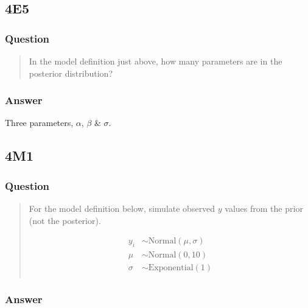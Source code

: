 \documentclass[
]{book}
\begin{document}
\hypertarget{e5-1}{%
\subsection*{4E5}\label{e5-1}}

\hypertarget{question-37}{%
\subsubsection*{Question}\label{question-37}}

\begin{quote}
In the model definition just above, how many parameters are in the posterior distribution?
\end{quote}

\hypertarget{answer-37}{%
\subsubsection*{Answer}\label{answer-37}}

Three parameters, \(\alpha\), \(\beta\) \& \(\sigma\).

\hypertarget{m1-2}{%
\subsection*{4M1}\label{m1-2}}

\hypertarget{question-38}{%
\subsubsection*{Question}\label{question-38}}

\begin{quote}
For the model definition below, simulate observed \(y\) values from the prior (not the posterior).

\[
\begin{aligned}
y_i &\sim \text{Normal}(\mu, \sigma) \\
\mu &\sim \text{Normal}(0, 10) \\
\sigma &\sim \text{Exponential}(1) \\
\end{aligned}
\]
\end{quote}

\hypertarget{answer-38}{%
\subsubsection*{Answer}\label{answer-38}}
\end{document}
